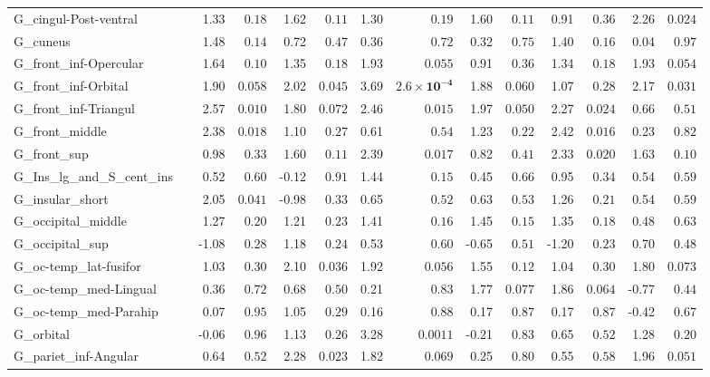 {\begin{longtable}{llrrrrrrrrrrrr}
G\_cingul-Post-ventral &  & 1.33 & $0.18$ & 1.62 & $0.11$ & 1.30 & $0.19$ & 1.60 & $0.11$ & 0.91 & $0.36$ & 2.26 & $0.024$ \\
G\_cuneus &  & 1.48 & $0.14$ & 0.72 & $0.47$ & 0.36 & $0.72$ & 0.32 & $0.75$ & 1.40 & $0.16$ & 0.04 & $0.97$ \\
G\_front\_inf-Opercular &  & 1.64 & $0.10$ & 1.35 & $0.18$ & 1.93 & $0.055$ & 0.91 & $0.36$ & 1.34 & $0.18$ & 1.93 & $0.054$ \\
G\_front\_inf-Orbital &  & 1.90 & $0.058$ & 2.02 & $0.045$ & 3.69 & $\mathbf{2.6{\times}10^{-4}}$ & 1.88 & $0.060$ & 1.07 & $0.28$ & 2.17 & $0.031$ \\
G\_front\_inf-Triangul &  & 2.57 & $0.010$ & 1.80 & $0.072$ & 2.46 & $0.015$ & 1.97 & $0.050$ & 2.27 & $0.024$ & 0.66 & $0.51$ \\
G\_front\_middle &  & 2.38 & $0.018$ & 1.10 & $0.27$ & 0.61 & $0.54$ & 1.23 & $0.22$ & 2.42 & $0.016$ & 0.23 & $0.82$ \\
G\_front\_sup &  & 0.98 & $0.33$ & 1.60 & $0.11$ & 2.39 & $0.017$ & 0.82 & $0.41$ & 2.33 & $0.020$ & 1.63 & $0.10$ \\
G\_Ins\_lg\_and\_S\_cent\_ins &  & 0.52 & $0.60$ & -0.12 & $0.91$ & 1.44 & $0.15$ & 0.45 & $0.66$ & 0.95 & $0.34$ & 0.54 & $0.59$ \\
G\_insular\_short &  & 2.05 & $0.041$ & -0.98 & $0.33$ & 0.65 & $0.52$ & 0.63 & $0.53$ & 1.26 & $0.21$ & 0.54 & $0.59$ \\
G\_occipital\_middle &  & 1.27 & $0.20$ & 1.21 & $0.23$ & 1.41 & $0.16$ & 1.45 & $0.15$ & 1.35 & $0.18$ & 0.48 & $0.63$ \\
G\_occipital\_sup &  & -1.08 & $0.28$ & 1.18 & $0.24$ & 0.53 & $0.60$ & -0.65 & $0.51$ & -1.20 & $0.23$ & 0.70 & $0.48$ \\
G\_oc-temp\_lat-fusifor &  & 1.03 & $0.30$ & 2.10 & $0.036$ & 1.92 & $0.056$ & 1.55 & $0.12$ & 1.04 & $0.30$ & 1.80 & $0.073$ \\
G\_oc-temp\_med-Lingual &  & 0.36 & $0.72$ & 0.68 & $0.50$ & 0.21 & $0.83$ & 1.77 & $0.077$ & 1.86 & $0.064$ & -0.77 & $0.44$ \\
G\_oc-temp\_med-Parahip &  & 0.07 & $0.95$ & 1.05 & $0.29$ & 0.16 & $0.88$ & 0.17 & $0.87$ & 0.17 & $0.87$ & -0.42 & $0.67$ \\
G\_orbital &  & -0.06 & $0.96$ & 1.13 & $0.26$ & 3.28 & $0.0011$ & -0.21 & $0.83$ & 0.65 & $0.52$ & 1.28 & $0.20$ \\
G\_pariet\_inf-Angular &  & 0.64 & $0.52$ & 2.28 & $0.023$ & 1.82 & $0.069$ & 0.25 & $0.80$ & 0.55 & $0.58$ & 1.96 & $0.051$ \\

\end{longtable}}
